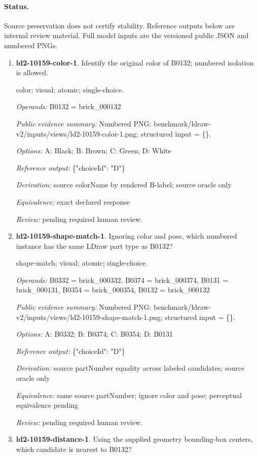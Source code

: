 \paragraph{Status.}Source preservation does not certify stability. Reference outputs below are internal review material. Full model inputs are the versioned public JSON and numbered PNGs.
\begin{enumerate}
\item \textbf{ld2-10159-color-1}. Identify the original color of B0132; numbered isolation is allowed.
\par{\small color; visual; atomic; single-choice.\par\textit{Operands:} B0132 = brick\_000132\par\textit{Public evidence summary:} Numbered PNG: benchmark/ldraw-v2/inputs/views/ld2-10159-color-1.png; structured input = \{\}.\par\textit{Options:} A: Black; B: Brown; C: Green; D: White\par\textit{Reference output:} \{"choiceId": "D"\}\par\textit{Derivation:} source colorName by rendered B-label; source oracle only\par\textit{Equivalence:} exact declared response\par\textit{Review:} pending required human review.}
\item \textbf{ld2-10159-shape-match-1}. Ignoring color and pose, which numbered instance has the same LDraw part type as B0132?
\par{\small shape-match; visual; atomic; single-choice.\par\textit{Operands:} B0332 = brick\_000332, B0374 = brick\_000374, B0131 = brick\_000131, B0354 = brick\_000354, B0132 = brick\_000132\par\textit{Public evidence summary:} Numbered PNG: benchmark/ldraw-v2/inputs/views/ld2-10159-shape-match-1.png; structured input = \{\}.\par\textit{Options:} A: B0332; B: B0374; C: B0354; D: B0131\par\textit{Reference output:} \{"choiceId": "D"\}\par\textit{Derivation:} source partNumber equality across labeled candidates; source oracle only\par\textit{Equivalence:} same source partNumber; ignore color and pose; perceptual equivalence pending\par\textit{Review:} pending required human review.}
\item \textbf{ld2-10159-distance-1}. Using the supplied geometry bounding-box centers, which candidate is nearest to B0132?

\end{enumerate}
